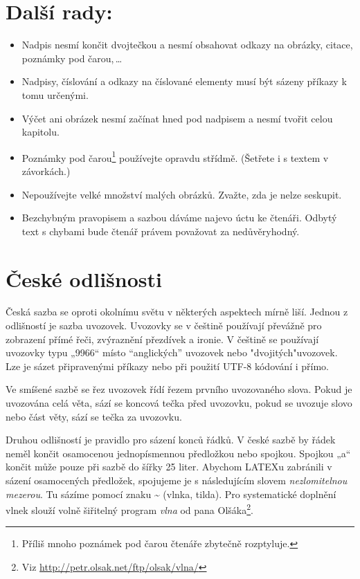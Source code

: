 \documentclass[10pt, a4paper, twocolumn]{article}
\begin{document}
\section{\Large Další rady:}
\begin{itemize}
    \item Nadpis nesmí končit dvojtečkou a nesmí
    obsahovat odkazy na obrázky, citace, poznámky pod čarou,\,\dots 
    \bigskip
    \item Nadpisy, číslování a odkazy na číslované elementy
          musí být sázeny příkazy k tomu určenými.
    \item Výčet ani obrázek nesmí začínat hned pod nadpisem
          a nesmí tvořit celou kapitolu.
    \item Poznámky pod čarou\footnote{\scriptsize {Příliš mnoho poznámek pod       čarou čtenáře zbytečně rozptyluje.}} používejte opravdu střídmě.
          (Šetřete i s textem v závorkách.)
    \item Nepoužívejte velké množství malých obrázků. Zvažte,
          zda je nelze seskupit.
    \item Bezchybným pravopisem a sazbou dáváme najevo
          úctu ke čtenáři. Odbytý text s chybami bude čtenář
          právem považovat za nedůvěryhodný.
\end{itemize}

\section{\Large České odlišnosti}
    Česká sazba se oproti okolnímu světu v některých aspektech mírně liší. Jednou z odlišností je sazba uvozovek. Uvozovky se v češtině používají převážně pro zobrazení přímé
    řeči, zvýraznění přezdívek a ironie. V češtině se používají
    uvozovky typu „9966“ místo “anglických” uvozovek nebo
    "dvojitých"uvozovek. Lze je sázet připravenými příkazy
    nebo při použití UTF-8 kódování i přímo.
    
    Ve smíšené sazbě se řez uvozovek řídí řezem prvního
    uvozovaného slova. Pokud je uvozována celá věta, sází se
    koncová tečka před uvozovku, pokud se uvozuje slovo nebo
    část věty, sází se tečka za uvozovku.
    
    Druhou odlišností je pravidlo pro sázení konců řádků.
    V české sazbě by řádek neměl končit osamocenou jednopísmennou předložkou nebo spojkou. Spojkou „a“ končit
    může pouze při sazbě do šířky 25 liter. Abychom LATEXu
    zabránili v sázení osamocených předložek, spojujeme je
    s následujícím slovem \textit{nezlomitelnou mezerou}. Tu sázíme
    pomocí znaku {\textasciitilde} (vlnka, tilda). Pro systematické doplnění
    vlnek slouží volně šiřitelný program \textit{vlna} od pana Olšáka\footnote{Viz {\url{http://petr.olsak.net/ftp/olsak/vlna/}}}.
    
\end{document}
